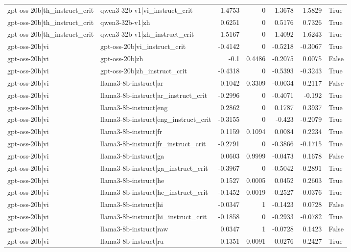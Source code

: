 \begin{table}
\begin{tabular}{l l r r r r l}
gpt-oss-20b|th_instruct_crit & qwen3-32b-v1|vi_instruct_crit & 1.4753 & 0 & 1.3678 & 1.5829 & True \\
gpt-oss-20b|th_instruct_crit & qwen3-32b-v1|zh & 0.6251 & 0 & 0.5176 & 0.7326 & True \\
gpt-oss-20b|th_instruct_crit & qwen3-32b-v1|zh_instruct_crit & 1.5167 & 0 & 1.4092 & 1.6243 & True \\
gpt-oss-20b|vi & gpt-oss-20b|vi_instruct_crit & -0.4142 & 0 & -0.5218 & -0.3067 & True \\
gpt-oss-20b|vi & gpt-oss-20b|zh & -0.1 & 0.4486 & -0.2075 & 0.0075 & False \\
gpt-oss-20b|vi & gpt-oss-20b|zh_instruct_crit & -0.4318 & 0 & -0.5393 & -0.3243 & True \\
gpt-oss-20b|vi & llama3-8b-instruct|ar & 0.1042 & 0.3309 & -0.0034 & 0.2117 & False \\
gpt-oss-20b|vi & llama3-8b-instruct|ar_instruct_crit & -0.2996 & 0 & -0.4071 & -0.192 & True \\
gpt-oss-20b|vi & llama3-8b-instruct|eng & 0.2862 & 0 & 0.1787 & 0.3937 & True \\
gpt-oss-20b|vi & llama3-8b-instruct|eng_instruct_crit & -0.3155 & 0 & -0.423 & -0.2079 & True \\
gpt-oss-20b|vi & llama3-8b-instruct|fr & 0.1159 & 0.1094 & 0.0084 & 0.2234 & True \\
gpt-oss-20b|vi & llama3-8b-instruct|fr_instruct_crit & -0.2791 & 0 & -0.3866 & -0.1715 & True \\
gpt-oss-20b|vi & llama3-8b-instruct|ga & 0.0603 & 0.9999 & -0.0473 & 0.1678 & False \\
gpt-oss-20b|vi & llama3-8b-instruct|ga_instruct_crit & -0.3967 & 0 & -0.5042 & -0.2891 & True \\
gpt-oss-20b|vi & llama3-8b-instruct|he & 0.1527 & 0.0005 & 0.0452 & 0.2603 & True \\
gpt-oss-20b|vi & llama3-8b-instruct|he_instruct_crit & -0.1452 & 0.0019 & -0.2527 & -0.0376 & True \\
gpt-oss-20b|vi & llama3-8b-instruct|hi & -0.0347 & 1 & -0.1423 & 0.0728 & False \\
gpt-oss-20b|vi & llama3-8b-instruct|hi_instruct_crit & -0.1858 & 0 & -0.2933 & -0.0782 & True \\
gpt-oss-20b|vi & llama3-8b-instruct|raw & 0.0347 & 1 & -0.0728 & 0.1423 & False \\
gpt-oss-20b|vi & llama3-8b-instruct|ru & 0.1351 & 0.0091 & 0.0276 & 0.2427 & True \\

\end{tabular}
\end{table}
